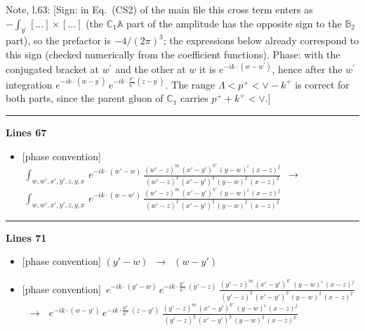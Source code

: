 \documentclass[10pt]{article}
\newenvironment{notebox}{\def\FrameCommand{{\color{notebar}\vrule width 1.5pt}\hspace{6pt}}\MakeFramed{\advance\hsize-\width\FrameRestore}\small}{\endMakeFramed}
\def\mf#1{\mathbb{#1}}
\begin{document}
\begin{notebox}\textsf{\small Note, l.63:} [Sign: in Eq.~(CS2) of the main file this cross term enters as $-\int_{y^{\prime}}[\dots]\times[\dots]$ (the $\mf{C}_1\mf{A}$ part of the amplitude has the opposite sign to the $\mf{B}_2$ part), so the prefactor is $-4/(2\pi)^3$; the expressions below already correspond to this sign (checked numerically from the coefficient functions). Phase: with the conjugated bracket at $w^{\prime}$ and the other at $w$ it is $e^{-ik\cdot(w-w^{\prime})}$, hence after the $w^{\prime}$ integration $e^{-ik\cdot(w-y^{\prime})}\,e^{-ik\cdot\frac{p^{+}}{k^{+}}(z-y^{\prime})}$. The range $\Lambda<p^{+}<\vee-k^{+}$ is correct for both parts, since the parent gluon of $\mf{C}_1$ carries $p^{+}+k^{+}<\vee$.]\end{notebox}
\noindent\rule{\linewidth}{0.3pt}\par\noindent\textbf{Lines 67} \par
\begin{itemize}[leftmargin=2.2em,itemsep=1pt,topsep=2pt]
\item[\textbf{l.67}] \textsf{\small [phase convention]} $\displaystyle \, \int_{w,w',x',y',z,y,x}\, e^{-ik\cdot (w'-w)}\, \frac{(w'-z)^{m}\,(x'-y')^{k'}\,(y-w)^{i}\,(x-z)^{j}}{(w'-z)^{2}\,(x'-y')^{2}\,(y-w)^{2}\,(x-z)^{2}}$\ $\longrightarrow$\ $\displaystyle \, \int_{w,w',x',y',z,y,x}\, e^{-ik\cdot (w-w')}\, \frac{(w'-z)^{m}\,(x'-y')^{k'}\,(y-w)^{i}\,(x-z)^{j}}{(w'-z)^{2}\,(x'-y')^{2}\,(y-w)^{2}\,(x-z)^{2}}$
\end{itemize}
\noindent\rule{\linewidth}{0.3pt}\par\noindent\textbf{Lines 71} \par
\begin{itemize}[leftmargin=2.2em,itemsep=1pt,topsep=2pt]
\item[\textbf{l.71}] \textsf{\small [phase convention]} $\displaystyle (y'-w)$\ $\longrightarrow$\ $\displaystyle (w-y')$
\item[\textbf{l.71}] \textsf{\small [phase convention]} $\displaystyle \, e^{-ik\cdot (y'-w)}\, e^{-ik\cdot \frac{p^{+}}{k^{+}}\,(y'-z)}\,\frac{(y'-z)^{m}\,(x'-y')^{k'}\,(y-w)^{i}\,(x-z)^{j}}{(y'-z)^{2}\,(x'-y')^{2}\,(y-w)^{2}\,(x-z)^{2}}$\ $\longrightarrow$\ $\displaystyle \, e^{-ik\cdot (w-y')}\, e^{-ik\cdot \frac{p^{+}}{k^{+}}\,(z-y')}\,\frac{(y'-z)^{m}\,(x'-y')^{k'}\,(y-w)^{i}\,(x-z)^{j}}{(y'-z)^{2}\,(x'-y')^{2}\,(y-w)^{2}\,(x-z)^{2}}$
\end{itemize}
\end{document}

